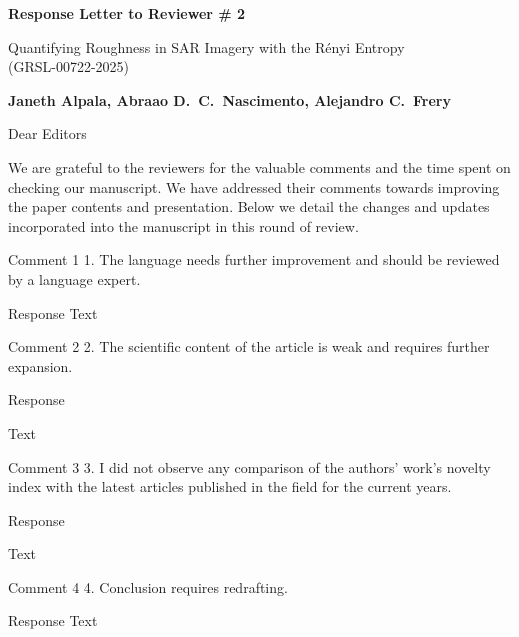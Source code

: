 \documentclass[11pt]{report}
\begin{document}
\begin{center}
\large{\textbf{Response Letter to Reviewer \# 2}}

\vglue 0.3cm

\huge{ Quantifying Roughness in SAR Imagery with the Rényi Entropy\\ (GRSL-00722-2025)}
\end{center}

\begin{center}
\textbf{Janeth Alpala,   Abraao D.\ C.\ Nascimento, Alejandro C.\ Frery }
\end{center}

\date{\today}



\vspace{2cm}
\noindent Dear Editors
\bigskip

\noindent We are grateful to the reviewers for the valuable comments and the time spent on checking our manuscript. 
We have addressed their comments towards improving the paper contents and presentation. 
Below we detail the changes and updates incorporated into the manuscript in this round of review.

\medskip


\begin{reviewbox}{Comment 1}
1. The language needs further improvement and should be reviewed by a language expert.
\end{reviewbox}

\begin{responsebox}{Response}
Text

\end{responsebox}

\begin{reviewbox}{Comment 2}
2. The scientific content of the article is weak and requires further expansion.
\end{reviewbox}

\begin{responsebox}{Response}

Text


\end{responsebox}

\begin{reviewbox}{Comment 3}
 3. I did not observe any comparison of the authors' work's novelty index with the latest articles published in the field for the current years.
\end{reviewbox}

\begin{responsebox}{Response}

Text
	
\end{responsebox}
\begin{reviewbox}{Comment 4}
4. Conclusion requires redrafting.
\end{reviewbox}
\begin{responsebox}{Response}
Text

\end{responsebox}
\end{document}
